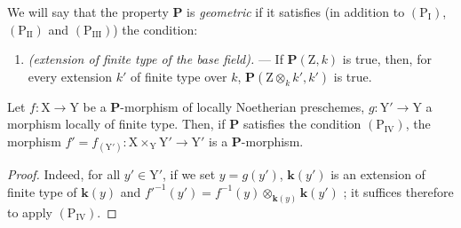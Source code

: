 
\begin{env}[7.3.6]
\label{IV.7.3.6}
We will say that the property $\boldsymbol{P}$ is \emph{geometric} if it satisfies (in addition to $(\mathrm{P_I})$, $(\mathrm{P_{II}})$ and $(\mathrm{P_{III}})$) the condition:
\begin{enumerate}
  \item[$(\mathrm{P_{IV}})$] \emph{(extension of finite type of the base field).} ---
  If $\boldsymbol{P}(\mathrm{Z},k)$ is true, then, for every extension $k'$ of finite type over $k$, $\boldsymbol{P}(\mathrm{Z}\otimes_k k',k')$ is true.
\end{enumerate}
\end{env}

\begin{lemma}[7.3.7]
\label{IV.7.3.7}
Let $f:\mathrm{X}\to\mathrm{Y}$ be a $\boldsymbol{P}$-morphism of locally Noetherian preschemes, $g:\mathrm{Y}'\to\mathrm{Y}$ a morphism locally of finite type.
Then, if $\boldsymbol{P}$ satisfies the condition $(\mathrm{P_{IV}})$, the morphism $f'=f_{(\mathrm{Y}')}:\mathrm{X}\times_\mathrm{Y}\mathrm{Y}'\to\mathrm{Y}'$ is a $\boldsymbol{P}$-morphism.
\end{lemma}

\begin{proof}
Indeed, for all $y'\in\mathrm{Y}'$, if we set $y=g(y')$, $\boldsymbol{k}(y')$ is an extension of finite type of $\boldsymbol{k}(y)$  and $f'^{-1}(y')=f^{-1}(y)\otimes_{\boldsymbol{k}(y)}\boldsymbol{k}(y')$ ; it suffices therefore to apply $(\mathrm{P_{IV}})$.
\end{proof}


